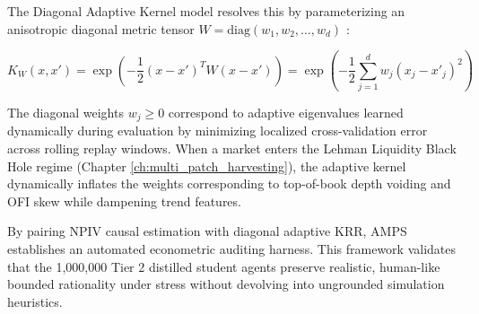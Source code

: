 The Diagonal Adaptive Kernel model resolves this by parameterizing an anisotropic diagonal metric tensor $W = \text{diag}(w_1, w_2, \dots, w_d)$ \cite{micchelli2005learning, li2025diagonal}:

\begin{equation}
    K_W(x, x') = \exp\left( -\frac{1}{2} (x - x')^T W (x - x') \right) = \exp\left( -\frac{1}{2} \sum_{j=1}^d w_j (x_j - x'_j)^2 \right)
\end{equation}

The diagonal weights $w_j \ge 0$ correspond to adaptive eigenvalues learned dynamically during evaluation by minimizing localized cross-validation error across rolling replay windows. When a market enters the Lehman Liquidity Black Hole regime (Chapter \ref{ch:multi_patch_harvesting}), the adaptive kernel dynamically inflates the weights corresponding to top-of-book depth voiding and OFI skew while dampening trend features.

By pairing NPIV causal estimation with diagonal adaptive KRR, AMPS establishes an automated econometric auditing harness. This framework validates that the 1,000,000 Tier 2 distilled student agents preserve realistic, human-like bounded rationality under stress without devolving into ungrounded simulation heuristics.
